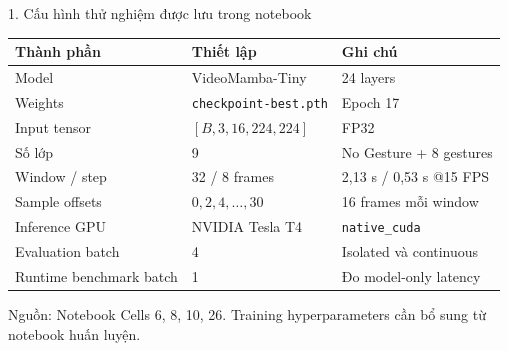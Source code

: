 \documentclass[aspectratio=169,9pt]{beamer}
\newcommand{\srcn}[1]{{\fontsize{7.0}{8.2}\selectfont\color{Muted}Nguồn: #1}}
\begin{document}
\begin{frame}{1. Cấu hình thử nghiệm được lưu trong notebook}
\vspace{0.02cm}
{\fontsize{8.2}{9.5}\selectfont
\renewcommand{\arraystretch}{1.16}
\begin{tabularx}{\linewidth}{@{}L{3.9cm}Y L{3cm}@{}}
\toprule
\textbf{Thành phần}&\textbf{Thiết lập}&\textbf{Ghi chú}\\\midrule
Model & VideoMamba-Tiny & 24 layers\\
Weights & \texttt{checkpoint-best.pth} & Epoch 17\\
Input tensor & $[B,3,16,224,224]$ & FP32\\
Số lớp & 9 & No Gesture + 8 gestures\\
Window / step & 32 / 8 frames & 2,13 s / 0,53 s @15 FPS\\
Sample offsets & $0,2,4,\ldots,30$ & 16 frames mỗi window\\
Inference GPU & NVIDIA Tesla T4 & \texttt{native\_cuda}\\
Evaluation batch & 4 & Isolated và continuous\\
Runtime benchmark batch & 1 & Đo model-only latency\\\bottomrule
\end{tabularx}
}
\vspace{0.08cm}
\srcn{Notebook Cells 6, 8, 10, 26. Training hyperparameters cần bổ sung từ notebook huấn luyện.}
\end{frame}
\end{document}
